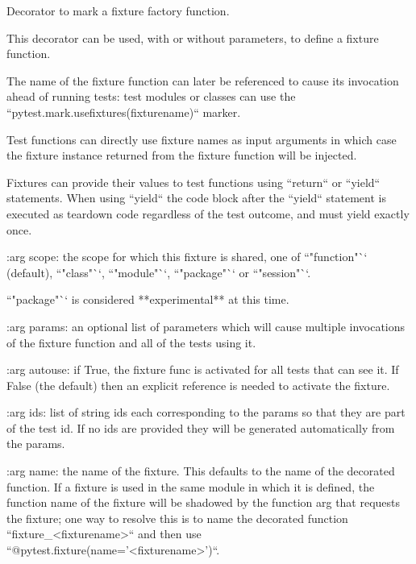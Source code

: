 \begin{DoxyVerb}Decorator to mark a fixture factory function.

This decorator can be used, with or without parameters, to define a
fixture function.

The name of the fixture function can later be referenced to cause its
invocation ahead of running tests: test
modules or classes can use the ``pytest.mark.usefixtures(fixturename)``
marker.

Test functions can directly use fixture names as input
arguments in which case the fixture instance returned from the fixture
function will be injected.

Fixtures can provide their values to test functions using ``return`` or ``yield``
statements. When using ``yield`` the code block after the ``yield`` statement is executed
as teardown code regardless of the test outcome, and must yield exactly once.

:arg scope: the scope for which this fixture is shared, one of
            ``"function"`` (default), ``"class"``, ``"module"``,
            ``"package"`` or ``"session"``.

            ``"package"`` is considered **experimental** at this time.

:arg params: an optional list of parameters which will cause multiple
            invocations of the fixture function and all of the tests
            using it.

:arg autouse: if True, the fixture func is activated for all tests that
            can see it.  If False (the default) then an explicit
            reference is needed to activate the fixture.

:arg ids: list of string ids each corresponding to the params
            so that they are part of the test id. If no ids are provided
            they will be generated automatically from the params.

:arg name: the name of the fixture. This defaults to the name of the
            decorated function. If a fixture is used in the same module in
            which it is defined, the function name of the fixture will be
            shadowed by the function arg that requests the fixture; one way
            to resolve this is to name the decorated function
            ``fixture_<fixturename>`` and then use
            ``@pytest.fixture(name='<fixturename>')``.
\end{DoxyVerb}
 \mbox{\label{namespace__pytest_1_1fixtures_a774fbc96746af54bc0891207dae6d82b}} 
